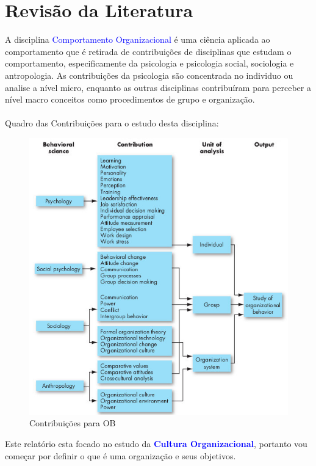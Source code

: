 \section{Revisão da Literatura}
\qquad A disciplina \textcolor{blue}{Comportamento Organizacional} é uma ciência aplicada ao comportamento que é retirada de contribuições de disciplinas que estudam o comportamento, especificamente da psicologia e psicologia social, sociologia e antropologia.
As contribuições da psicologia são concentrada no individuo ou analise a nível micro, enquanto as outras disciplinas contribuíram para perceber a nível macro conceitos como procedimentos de grupo e organização.\cite{book_2} \\
\\
Quadro das Contribuições para o estudo desta disciplina:
\begin{figure}[H]
\centering
\includegraphics[scale=0.52]{./image/OB/OB_contributions.jpg}
\caption{Contribuições para OB \cite{book_2}}
\end{figure}
Este relatório esta focado no estudo da \textcolor{blue}{\textbf{Cultura Organizacional}}, portanto vou começar por definir o que é uma organização e seus objetivos.\\
\\
